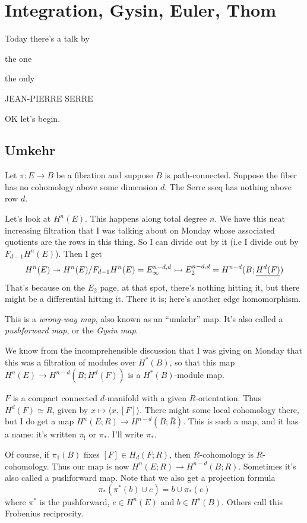 \section{Integration, Gysin, Euler, Thom}\label{gysin-sequence}
Today
there's a talk by

the
one

the
only

JEAN-PIERRE SERRE

OK let's begin.
\subsection{Umkehr}
Let $\pi:E \to B$ be a fibration and suppose $B$ is path-connected.
Suppose the fiber has no cohomology above some dimension $d$.
The Serre sseq has nothing above row $d$.

Let's look at $H^n(E)$.
This happens along total degree $n$.
We have this neat increasing filtration that I was talking about on Monday whose associated quotients are the rows in this thing.
So I can divide out by it (i.e I divide out by $F_{d-1} H^n(E)$).
Then I get 
$$H^n(E) \twoheadrightarrow H^n(E) / F_{d-1} H^n(E) = E^{n-d,d}_\infty \rightarrowtail E_2^{n-d,d} = H^{n-d}(B;\underline{H^d(F)})$$
That's because on the $E_2$ page, at that spot, there's nothing hitting it, but there might be a differential hitting it.
There it is; here's another edge homomorphism.

\begin{remark}
This is a \emph{wrong-way map}, also known as an ``umkehr'' map.
It's also called a \emph{pushforward map}, or the \emph{Gysin map}.
\end{remark}

We know from the incomprehensible discussion that I was giving on Monday that this was a filtration of modules over $H^\ast(B)$, so that this map $H^n(E) \to H^{n-d}(B;\underline{H^d(F)})$ is a $H^\ast(B)$-module map.

\begin{example}
    $F$ is a compact connected $d$-manifold with a given $R$-orientation.
    Thus $H^d(F) \simeq R$, given by $x\mapsto \langle x, [F]\rangle$.
    There might some local cohomology there, but I do get a map $H^n(E;R) \to H^{n-d}(B;\overline{R})$.
    This is such a map, and it has a name: it's written $\pi_!$ or $\pi_\ast$.
    I'll write $\pi_\ast$.
    
    Of course, if $\pi_1(B)$ fixes $[F]\in H_d(F;R)$, then $\underline{R}$-cohomology is $R$-cohomology.
    Thus our map is now $H^n(E;R) \to H^{n-d}(B;R)$.
    Sometimes it's also called a pushforward map.
    Note that we also get a projection formula
    $$
    \pi_\ast(\pi^\ast(b)\cup e) = b\cup \pi_\ast(e)
    $$
    where $\pi^\ast$ is the pushforward, $e\in H^n(E)$ and $b\in H^s(B)$.
    Others call this Frobenius reciprocity.
\end{example}

